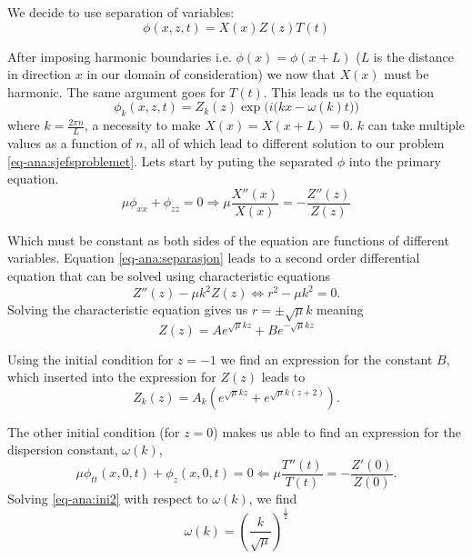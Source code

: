 \documentclass[12pt]{article}
\begin{document}
We decide to use separation of variables:
\begin{equation}
\phi(x,z,t) = X(x)Z(z)T(t)
\end{equation}

After imposing harmonic boundaries i.e. $\phi(x) = \phi(x+L)$ ($L$ is the distance in direction $x$ in our domain of consideration)
we now that $X(x)$ must be harmonic. The same argument goes for $T(t)$. This leads us to the equation
\begin{equation}
\phi_k (x,z,t) = Z_k(z) \exp \Big( i \big( kx - \omega(k)t \big) \Big)
\end{equation}
where $k=\frac{2 \pi n}{L}$, a necessity to make $X(x) = X(x+L) = 0$. $k$ can take multiple values as a function of $n$,
all of which lead to different solution to our problem \eqref{eq-ana:sjefsproblemet}. Lets start by puting the separated $\phi$ into the primary equation.
\begin{equation}
\mu \phi_{xx} + \phi_{zz} = 0 \Longrightarrow \mu \frac{X '' (x)}{X(x)} = -\frac{Z '' (z)}{Z(z)}
\label{eq-ana:separasjon}
\end{equation}

Which must be constant as both sides of the equation are functions of different variables. Equation \eqref{eq-ana:separasjon}
leads to a second order differential equation that can be solved using characteristic equations
\begin{equation}
Z''(z) - \mu k^2 Z(z) \Longleftrightarrow r^2 - \mu k^2 = 0.
\end{equation}
Solving the characteristic equation gives us $r = \pm \sqrt{\mu}k$ meaning
\begin{equation}
Z(z) = A e^{\sqrt{\mu}k z} + Be^{-\sqrt{\mu}k z}
\end{equation}

Using the initial condition for $z = -1$ we find an expression for the constant $B$, which inserted into the expression for $Z(z)$ leads to
\begin{equation}
Z_k(z) = A_k \left( e^{\sqrt{\mu}kz} + e^{ \sqrt{\mu}k(z+2) } \right).
\end{equation}

The other initial condition (for $z=0$) makes us able to find an expression for the dispersion constant, $\omega(k)$,
\begin{equation}
\mu \phi_{tt}(x,0,t) + \phi_{z}(x,0,t) = 0 \Longleftarrow \mu \frac{T''(t)}{T(t)} = - \frac{Z'(0)}{Z(0)}.
\label{eq-ana:ini2}
\end{equation}
Solving \eqref{eq-ana:ini2} with respect to $\omega(k)$, we find
\begin{equation}
\omega(k) = \left( \frac{k}{\sqrt{\mu}} \right)^{\frac{1}{2}}
\end{equation}
\end{document}
